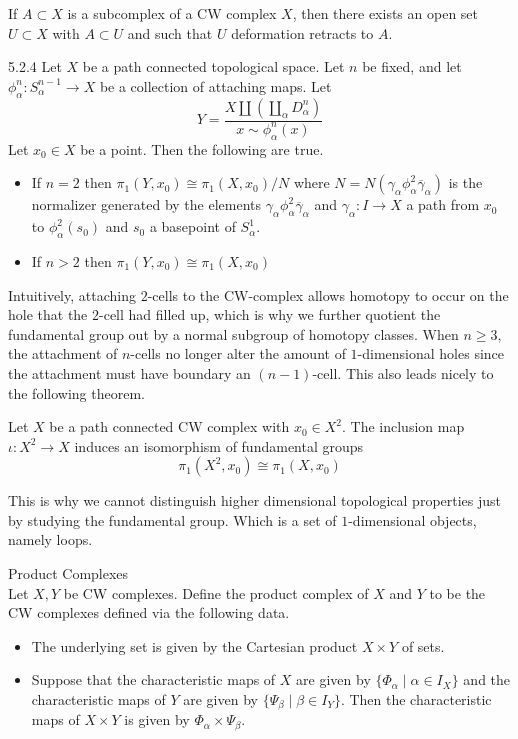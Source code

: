 \documentclass[a4paper]{article}
\begin{document}
\begin{prp}{}{} If $A\subset X$ is a subcomplex of a CW complex $X$, then there exists an open set $U\subset X$ with $A\subset U$ and such that $U$ deformation retracts to $A$. 
\end{prp}

\begin{prp}{}{5.2.4} Let $X$ be a path connected topological space. Let $n$ be fixed, and let $\phi_\alpha^n:S_\alpha^{n-1}\to X$ be a collection of attaching maps. Let $$Y=\frac{X\amalg\left(\coprod_{\alpha}D_\alpha^n\right)}{x\sim\phi_\alpha^n(x)}$$ Let $x_0\in X$ be a point. Then the following are true. 
\begin{itemize}
\item If $n=2$ then $\pi_1(Y,x_0)\cong\pi_1(X,x_0)/N$ where $N=N(\gamma_\alpha\phi_\alpha^2\overline{\gamma}_\alpha)$ is the normalizer generated by the elements $\gamma_\alpha\phi_\alpha^2\overline{\gamma}_\alpha$ and $\gamma_\alpha:I\to X$ a path from $x_0$ to $\phi_\alpha^2(s_0)$ and $s_0$ a basepoint of $S_\alpha^1$. 
\item If $n>2$ then $\pi_1(Y,x_0)\cong\pi_1(X,x_0)$
\end{itemize}
\end{prp}

Intuitively, attaching $2$-cells to the CW-complex allows homotopy to occur on the hole that the $2$-cell had filled up, which is why we further quotient the fundamental group out by a normal subgroup of homotopy classes. When $n\geq 3$, the attachment of $n$-cells no longer alter the amount of $1$-dimensional holes since the attachment must have boundary an $(n-1)$-cell. This also leads nicely to the following theorem. 

\begin{thm}{}{} Let $X$ be a path connected CW complex with $x_0\in X^2$. The inclusion map $\iota:X^2\to X$ induces an isomorphism of fundamental groups $$\pi_1(X^2,x_0)\cong\pi_1(X,x_0)$$
\end{thm}

This is why we cannot distinguish higher dimensional topological properties just by studying the fundamental group. Which is a set of $1$-dimensional objects, namely loops. 

\begin{defn}{Product Complexes}{}\\
Let $X,Y$ be CW complexes. Define the product complex of $X$ and $Y$ to be the CW complexes defined via the following data. 
\begin{itemize}
\item The underlying set is given by the Cartesian product $X\times Y$ of sets. 
\item Suppose that the characteristic maps of $X$ are given by $\{\Phi_\alpha\;|\;\alpha\in I_X\}$ and the characteristic maps of $Y$ are given by $\{\Psi_\beta\;|\;\beta\in I_Y\}$. Then the characteristic maps of $X\times Y$ is given by $\Phi_\alpha\times\Psi_\beta$. 
\end{itemize}
\end{defn}
\end{document}

